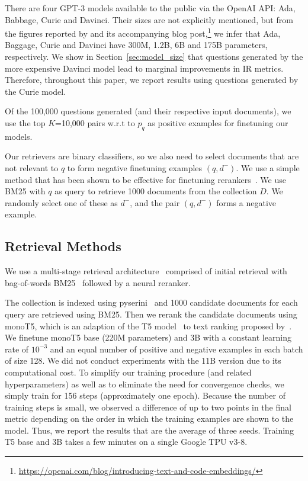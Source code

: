\documentclass[11pt]{article}
\begin{document}
There are four GPT-3 models available to the public via the OpenAI API: Ada, Babbage, Curie and Davinci. Their sizes are not explicitly mentioned, but from the figures reported by \citet{neelakantan2022text} and its accompanying blog post,\footnote{\url{https://openai.com/blog/introducing-text-and-code-embeddings/}} we infer that Ada, Baggage, Curie and Davinci have 300M, 1.2B, 6B and 175B parameters, respectively.
We show in Section~\ref{sec:model_size} that questions generated by the more expensive Davinci model lead to marginal improvements in IR metrics. Therefore, throughout this paper, we report results using questions generated by the Curie model.

Of the 100,000 questions generated (and their respective input documents), we use the top $K$=10,000 pairs w.r.t to $p_q$ as positive examples for finetuning our models.

Our retrievers are binary classifiers, so we also need to select documents that are not relevant to $q$ to form negative finetuning examples $(q, d^-)$.
We use a simple method that has been shown to be effective for finetuning rerankers~\cite{pradeep2021expando}.
We use BM25 with $q$ as query to retrieve 1000 documents from the collection $D$. We randomly select one of these as $d^-$, and the pair $(q,d^-)$ forms a negative example.


\subsection{Retrieval Methods}

We use a multi-stage retrieval architecture~\cite{matveeva2006high,wang2011cascade,chen2017efficient,liu2017cascade} comprised of initial retrieval with bag-of-words BM25~\cite{robertson1995okapi} followed by a neural reranker.

The collection is indexed using pyserini~\cite{lin2021pyserini} and 1000 candidate documents for each query are retrieved using BM25. 
Then we rerank the candidate documents using monoT5, which is an adaption of the T5 model~\cite{raffel2020exploring} to text ranking proposed by~\citet{nogueira2020document}.
We finetune monoT5 base (220M parameters) and 3B with a constant learning rate of $10^{-3}$ and an equal number of positive and negative examples in each batch of size 128. We did not conduct experiments with the 11B version due to its computational cost. To simplify our training procedure (and related hyperparameters) as well as to eliminate the need for convergence checks, we simply train for 156 steps (approximately one epoch).
Because the number of training steps is small, we observed a difference of up to two points in the final metric depending on the order in which the training examples are shown to the model. Thus, we report the results that are the average of three seeds.
Training T5 base and 3B takes a few minutes on a single Google TPU v3-8.
\end{document}
